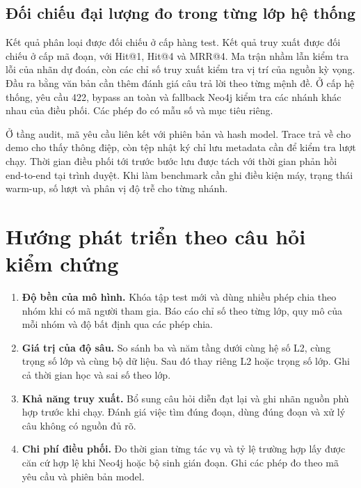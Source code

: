 \subsection{Đối chiếu đại lượng đo trong từng lớp hệ thống}
Kết quả phân loại được đối chiếu ở cấp hàng test. Kết quả truy xuất được đối chiếu ở cấp mã đoạn, với Hit@1, Hit@4 và MRR@4. Ma trận nhầm lẫn kiểm tra lỗi của nhãn dự đoán, còn các chỉ số truy xuất kiểm tra vị trí của nguồn kỳ vọng. Đầu ra bằng văn bản cần thêm đánh giá câu trả lời theo từng mệnh đề. Ở cấp hệ thống, yêu cầu 422, bypass an toàn và fallback Neo4j kiểm tra các nhánh khác nhau của điều phối. Các phép đo có mẫu số và mục tiêu riêng.

Ở tầng audit, mã yêu cầu liên kết với phiên bản và hash model. Trace trả về cho demo cho thấy thông điệp, còn tệp nhật ký chỉ lưu metadata cần để kiểm tra lượt chạy. Thời gian điều phối tới trước bước lưu được tách với thời gian phản hồi end-to-end tại trình duyệt. Khi làm benchmark cần ghi điều kiện máy, trạng thái warm-up, số lượt và phân vị độ trễ cho từng nhánh.

\section{Hướng phát triển theo câu hỏi kiểm chứng}
\begin{enumerate}
\item \textbf{Độ bền của mô hình.} Khóa tập test mới và dùng nhiều phép chia theo nhóm khi có mã người tham gia. Báo cáo chỉ số theo từng lớp, quy mô của mỗi nhóm và độ bất định qua các phép chia.
\item \textbf{Giá trị của độ sâu.} So sánh ba và năm tầng dưới cùng hệ số L2, cùng trọng số lớp và cùng bộ dữ liệu. Sau đó thay riêng L2 hoặc trọng số lớp. Ghi cả thời gian học và sai số theo lớp.
\item \textbf{Khả năng truy xuất.} Bổ sung câu hỏi diễn đạt lại và ghi nhãn nguồn phù hợp trước khi chạy. Đánh giá việc tìm đúng đoạn, dùng đúng đoạn và xử lý câu không có nguồn đủ rõ.
\item \textbf{Chi phí điều phối.} Đo thời gian từng tác vụ và tỷ lệ trường hợp lấy được căn cứ hợp lệ khi Neo4j hoặc bộ sinh gián đoạn. Ghi các phép đo theo mã yêu cầu và phiên bản model.
\end{enumerate}
